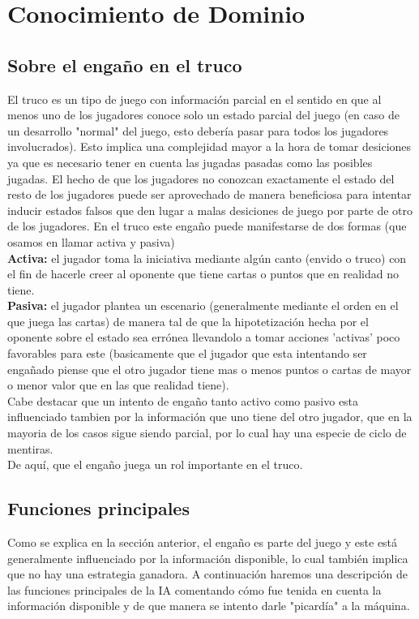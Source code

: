 \documentclass[12pt,a4paper]{article}
\begin{document}
\section{Conocimiento de Dominio}

\subsection{Sobre el enga\~no en el truco}

El truco es un tipo de juego con informaci\'on parcial en el sentido en que al menos uno de los jugadores
conoce solo un estado parcial del juego (en caso de un desarrollo "normal" del juego, esto deber\'ia 
pasar para todos los jugadores involucrados). Esto implica una complejidad mayor a la hora de tomar desiciones
ya que es necesario tener en cuenta las jugadas pasadas como las posibles jugadas. 
El hecho de que los jugadores no conozcan exactamente el estado del resto de los jugadores puede ser aprovechado
de manera beneficiosa para intentar inducir estados falsos que den lugar a malas desiciones de juego 
por parte de otro de los jugadores. En el truco este enga\~no puede manifestarse de dos formas (que osamos en llamar
activa y pasiva)\\
\textbf{Activa:} el jugador toma la iniciativa mediante alg\'un canto (envido o truco) con el fin de hacerle creer al oponente que tiene
cartas o puntos que en realidad no tiene.\\
\textbf{Pasiva:} el jugador plantea un escenario (generalmente mediante el orden en el que juega las cartas) de manera tal de que 
la hipotetizaci\'on hecha por el oponente sobre el estado sea err\'onea llevandolo a tomar acciones 'activas' poco favorables para 
este (basicamente que el jugador que esta intentando ser enga\~nado piense que el otro jugador tiene mas o menos puntos o cartas de 
mayor o menor valor que en las que realidad tiene).\\
Cabe destacar que un intento de enga\~no tanto activo como pasivo esta influenciado tambien por la informaci\'on que uno tiene del otro jugador,
que en la mayoria de los casos sigue siendo parcial,  por lo cual hay una especie de ciclo de mentiras.\\
De aqu\'i, que el enga\~no juega un rol importante en el truco.

\subsection{Funciones principales}
Como se explica en la secci\'on anterior, el enga\~no es parte del juego y este est\'a generalmente influenciado por
la informaci\'on disponible, lo cual tambi\'en implica que no hay una estrategia ganadora. 
A continuaci\'on haremos una descripci\'on de las funciones principales de la IA comentando c\'omo fue tenida en cuenta la 
informaci\'on disponible y de que manera se intento darle "picard\'ia" a la m\'aquina.
\end{document}
